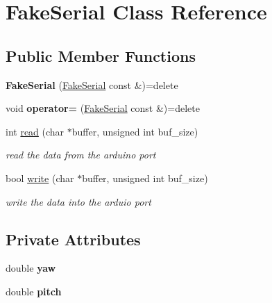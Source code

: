 \hypertarget{structFakeSerial}{}\section{Fake\+Serial Class Reference}
\label{structFakeSerial}
\subsection*{Public Member Functions}
\begin{DoxyCompactItemize}
\item 
\mbox{\label{structFakeSerial_a63a10269c62490d9a3406e086b70d035}} 
{\bfseries Fake\+Serial} (\mbox{\hyperlink{structFakeSerial}{Fake\+Serial}} const \&)=delete
\item 
\mbox{\label{structFakeSerial_ab7554e211e435a9079d4395486eb6f9e}} 
void {\bfseries operator=} (\mbox{\hyperlink{structFakeSerial}{Fake\+Serial}} const \&)=delete
\item 
int \mbox{\hyperlink{structFakeSerial_ade2cc0ebb2014c45bdf2f5fb622da418}{read}} (char $\ast$buffer, unsigned int buf\+\_\+size)
\begin{DoxyCompactList}\small\item\em read the data from the arduino port \end{DoxyCompactList}\item 
bool \mbox{\hyperlink{structFakeSerial_ab25e13142d016f62831867434bcbd7cd}{write}} (char $\ast$buffer, unsigned int buf\+\_\+size)
\begin{DoxyCompactList}\small\item\em write the data into the arduio port \end{DoxyCompactList}\end{DoxyCompactItemize}
\subsection*{Private Attributes}
\begin{DoxyCompactItemize}
\item 
\mbox{\label{structFakeSerial_a70ec5b8efe8fb0c15407db3c35732e6f}} 
double {\bfseries yaw}
\item 
\mbox{\label{structFakeSerial_af5976686fbb6a720b9c15d9e3bd6a8c2}} 
double {\bfseries pitch}
\end{DoxyCompactItemize}
